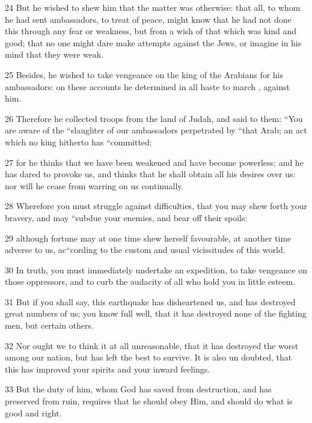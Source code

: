 \par 24 But he wished to shew him that the matter was otherwise: that all, to whom he had sent ambassadors, to treat of peace, might know that he had not done this through any fear or weakness, but from a wish of that which was kind and good; that no one might dare make attempts against the Jews, or imagine in his mind that they were weak. 

\par 25 Besides, he wished to take vengeance on the king of the Arabians for his ambassadors: on these accounts he determined in all haste to march , against him. 

\par 26 Therefore he collected troops from the land of Judah, and said to them: “You are aware of the “slaughter of our ambassadors perpetrated by “that Arab; an act which no king hitherto has “committed: 

\par 27 for he thinks that we have been weakened and have become powerless; and he has dared to provoke us, and thinks that he shall obtain all his desires over us: nor will he cease from warring on us continually. 

\par 28 Wherefore you must struggle against difficulties, that you may shew forth your bravery, and may “subdue your enemies, and bear off their spoils: 

\par 29 although fortune may at one time shew herself favourable, at another time adverse to us, ac“cording to the custom and usual vicissitudes of this world. 

\par 30 In truth, you must immediately undertake an expedition, to take vengeance on those oppressors, and to curb the audacity of all who hold you in little esteem. 

\par 31 But if you shall say, this earthquake has disheartened us, and has destroyed great numbers of us; you know full well, that it has destroyed none of the fighting men, but certain others. 

\par 32 Nor ought we to think it at all unreasonable, that it has destroyed the worst among our nation, but has left the best to survive. It is also un doubted, that this has improved your spirits and your inward feelings. 

\par 33 But the duty of him, whom God has saved from destruction, and has preserved from ruin, requires that he should obey Him, and should do what is good and right. 

